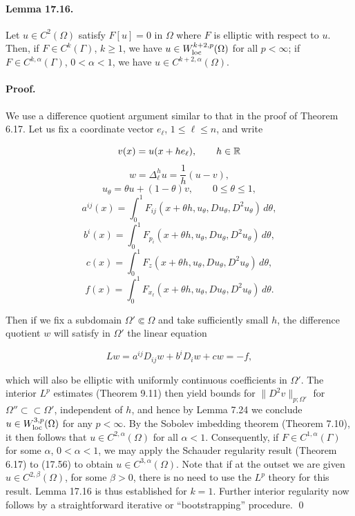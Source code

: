 \paragraph{Lemma 17.16.}
Let $u \in C^2(\Omega)$ satisfy $F[u]=0$ in $\Omega$ where $F$ is elliptic with respect to $u$. Then, if $F \in C^k(\Gamma)$, $k \ge 1$, we have $u \in W^{k+2,p}_{\mathrm{loc}}(\Omega)$ for all $p<\infty$; if $F \in C^{k,\alpha}(\Gamma)$, $0<\alpha<1$, we have $u \in C^{k+2,\alpha}(\Omega)$.

\paragraph{Proof.}
We use a difference quotient argument similar to that in the proof of Theorem 6.17. Let us fix a coordinate vector $e_\ell$, $1 \le \ell \le n$, and write

\[
v(x)=u(x+he_\ell), \qquad h \in \mathbb{R}
\]
\[
w=\Delta_\ell^h u=\frac{1}{h}(u-v),
\]
\[
u_\theta=\theta u+(1-\theta)v, \qquad 0 \le \theta \le 1,
\]
\[
a^{ij}(x)=\int_0^1 F_{ij}(x+\theta h,u_\theta,Du_\theta,D^2u_\theta)\,d\theta,
\]
\[
b^i(x)=\int_0^1 F_{p_i}(x+\theta h,u_\theta,Du_\theta,D^2u_\theta)\,d\theta,
\]
\[
c(x)=\int_0^1 F_z(x+\theta h,u_\theta,Du_\theta,D^2u_\theta)\,d\theta,
\]
\[
f(x)=\int_0^1 F_{x_\ell}(x+\theta h,u_\theta,Du_\theta,D^2u_\theta)\,d\theta.
\]

Then if we fix a subdomain $\Omega' \Subset \Omega$ and take sufficiently small $h$, the difference quotient $w$ will satisfy in $\Omega'$ the linear equation

\begin{equation}
Lw=a^{ij}D_{ij}w+b^iD_iw+cw=-f,
\tag{17.56}
\end{equation}

\begin{flushleft}
which will also be elliptic with uniformly continuous coefficients in $\Omega'$. The interior
$L^p$ estimates (Theorem 9.11) then yield bounds for $\|D^2v\|_{p;\Omega'}$ for $\Omega'' \subset \subset \Omega'$,
independent of $h$, and hence by Lemma 7.24 we conclude $u \in W^{3,p}_{\mathrm{loc}}(\Omega)$ for any
$p<\infty$. By the Sobolev imbedding theorem (Theorem 7.10), it then follows that
$u \in C^{2,\alpha}(\Omega)$ for all $\alpha<1$. Consequently, if $F \in C^{1,\alpha}(\Gamma)$ for some $\alpha$, $0<\alpha<1$, we
may apply the Schauder regularity result (Theorem 6.17) to (17.56) to obtain
$u \in C^{3,\alpha}(\Omega)$. Note that if at the outset we are given $u \in C^{2,\beta}(\Omega)$, for some $\beta>0$, there
is no need to use the $L^p$ theory for this result. Lemma 17.16 is thus established for
$k=1$. Further interior regularity now follows by a straightforward iterative or
``bootstrapping'' procedure. \qed
\end{flushleft}

